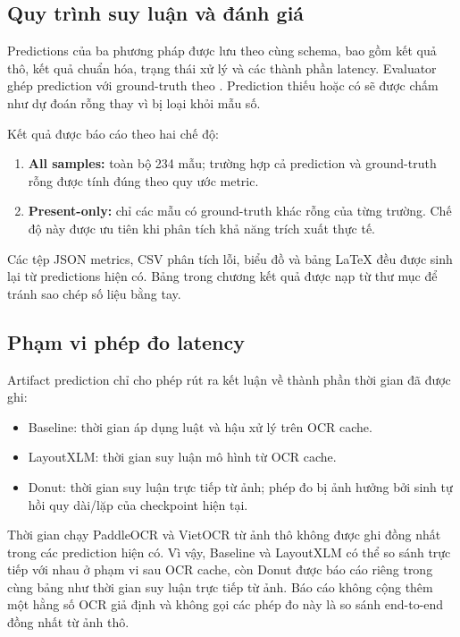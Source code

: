 \subsection{Quy trình suy luận và đánh giá}
\label{subsec:evaluation_protocol}

Predictions của ba phương pháp được lưu theo cùng schema, bao gồm kết quả thô, kết quả chuẩn hóa, trạng thái xử lý và các thành phần latency. Evaluator ghép prediction với ground-truth theo . Prediction thiếu hoặc có  sẽ được chấm như dự đoán rỗng thay vì bị loại khỏi mẫu số.

Kết quả được báo cáo theo hai chế độ:
\begin{enumerate}
  \item \textbf{All samples:} toàn bộ 234 mẫu; trường hợp cả prediction và ground-truth rỗng được tính đúng theo quy ước metric.
  \item \textbf{Present-only:} chỉ các mẫu có ground-truth khác rỗng của từng trường. Chế độ này được ưu tiên khi phân tích khả năng trích xuất thực tế.
\end{enumerate}

Các tệp JSON metrics, CSV phân tích lỗi, biểu đồ và bảng LaTeX đều được sinh lại từ predictions hiện có. Bảng trong chương kết quả được nạp từ thư mục  để tránh sao chép số liệu bằng tay.

\subsection{Phạm vi phép đo latency}
\label{subsec:latency_protocol}

Artifact prediction chỉ cho phép rút ra kết luận về thành phần thời gian đã được ghi:
\begin{itemize}
  \item Baseline: thời gian áp dụng luật và hậu xử lý trên OCR cache.
  \item LayoutXLM: thời gian suy luận mô hình từ OCR cache.
  \item Donut: thời gian suy luận trực tiếp từ ảnh; phép đo bị ảnh hưởng bởi sinh tự hồi quy dài/lặp của checkpoint hiện tại.
\end{itemize}

Thời gian chạy PaddleOCR và VietOCR từ ảnh thô không được ghi đồng nhất trong các prediction hiện có. Vì vậy, Baseline và LayoutXLM có thể so sánh trực tiếp với nhau ở phạm vi sau OCR cache, còn Donut được báo cáo riêng trong cùng bảng như thời gian suy luận trực tiếp từ ảnh. Báo cáo không cộng thêm một hằng số OCR giả định và không gọi các phép đo này là so sánh end-to-end đồng nhất từ ảnh thô.

